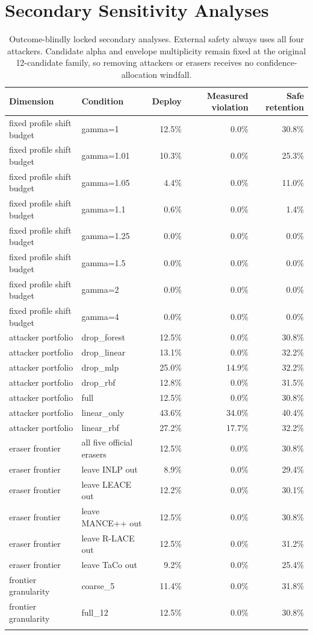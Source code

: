 \section{Secondary Sensitivity Analyses}
\begin{table}[t]
\centering\scriptsize
\begin{tabular}{llrrr}
\toprule
Dimension & Condition & Deploy & Measured violation & Safe retention \\
\midrule
fixed profile shift budget & gamma=1 & 12.5\% & 0.0\% & 30.8\% \\
fixed profile shift budget & gamma=1.01 & 10.3\% & 0.0\% & 25.3\% \\
fixed profile shift budget & gamma=1.05 & 4.4\% & 0.0\% & 11.0\% \\
fixed profile shift budget & gamma=1.1 & 0.6\% & 0.0\% & 1.4\% \\
fixed profile shift budget & gamma=1.25 & 0.0\% & 0.0\% & 0.0\% \\
fixed profile shift budget & gamma=1.5 & 0.0\% & 0.0\% & 0.0\% \\
fixed profile shift budget & gamma=2 & 0.0\% & 0.0\% & 0.0\% \\
fixed profile shift budget & gamma=4 & 0.0\% & 0.0\% & 0.0\% \\
\addlinespace
attacker portfolio & drop\_forest & 12.5\% & 0.0\% & 30.8\% \\
attacker portfolio & drop\_linear & 13.1\% & 0.0\% & 32.2\% \\
attacker portfolio & drop\_mlp & 25.0\% & 14.9\% & 32.2\% \\
attacker portfolio & drop\_rbf & 12.8\% & 0.0\% & 31.5\% \\
attacker portfolio & full & 12.5\% & 0.0\% & 30.8\% \\
attacker portfolio & linear\_only & 43.6\% & 34.0\% & 40.4\% \\
attacker portfolio & linear\_rbf & 27.2\% & 17.7\% & 32.2\% \\
\addlinespace
eraser frontier & all five official erasers & 12.5\% & 0.0\% & 30.8\% \\
eraser frontier & leave INLP out & 8.9\% & 0.0\% & 29.4\% \\
eraser frontier & leave LEACE out & 12.2\% & 0.0\% & 30.1\% \\
eraser frontier & leave MANCE++ out & 12.5\% & 0.0\% & 30.8\% \\
eraser frontier & leave R-LACE out & 12.5\% & 0.0\% & 31.2\% \\
eraser frontier & leave TaCo out & 9.2\% & 0.0\% & 25.4\% \\
\addlinespace
frontier granularity & coarse\_5 & 11.4\% & 0.0\% & 31.8\% \\
frontier granularity & full\_12 & 12.5\% & 0.0\% & 30.8\% \\
\addlinespace
\bottomrule
\end{tabular}
\caption{Outcome-blindly locked secondary analyses. External safety always uses all four attackers. Candidate alpha and envelope multiplicity remain fixed at the original 12-candidate family, so removing attackers or erasers receives no confidence-allocation windfall.}
\label{tab:ablations}
\end{table}
